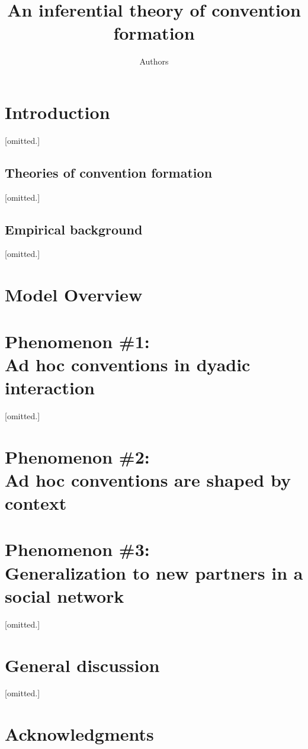 \documentclass[11pt, floatsintext]{apa6}
\title{An inferential theory of convention formation}
\author{Authors}
\affiliation{Universities}
\begin{document}
\maketitle

\section{Introduction}

[omitted.]

\subsection{Theories of convention formation}

[omitted.]


\subsection{Empirical background}

[omitted.]

%

\section{Model Overview}




\section{Phenomenon \#1: \\ Ad hoc conventions in dyadic interaction}

[omitted.]

\section{Phenomenon \#2: \\Ad hoc conventions are shaped by context}



\section{Phenomenon \#3: \\Generalization to new partners in a social network}

[omitted.]

%

\section{General discussion}

[omitted.]

%


\section{\bf Acknowledgments}
\small



\end{document}
